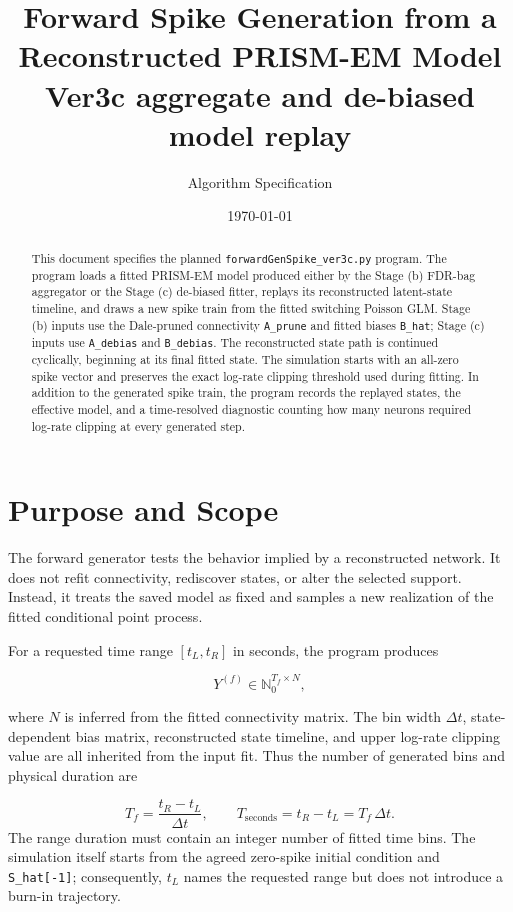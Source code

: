 \documentclass[11pt]{article}
\title{Forward Spike Generation from a Reconstructed PRISM-EM Model\\
\large Ver3c aggregate and de-biased model replay}
\author{Algorithm Specification}
\date{\today}
\begin{document}
\maketitle

\begin{abstract}
This document specifies the planned
\texttt{forwardGenSpike\_ver3c.py} program. The program loads a fitted
PRISM-EM model produced either by the Stage (b) FDR-bag aggregator or the
Stage (c) de-biased fitter, replays its reconstructed latent-state timeline,
and draws a new spike train from the fitted switching Poisson GLM.
Stage (b) inputs use the Dale-pruned connectivity
\texttt{A\_prune} and fitted biases \texttt{B\_hat}; Stage (c) inputs use
\texttt{A\_debias} and \texttt{B\_debias}. The reconstructed state path is
continued cyclically, beginning at its final fitted state. The simulation
starts with an all-zero spike vector and preserves the exact log-rate
clipping threshold used during fitting. In addition to the generated spike
train, the program records the replayed states, the effective model, and a
time-resolved diagnostic counting how many neurons required log-rate
clipping at every generated step.
\end{abstract}

\tableofcontents
\newpage

\section{Purpose and Scope}
\label{sec:scope}

The forward generator tests the behavior implied by a reconstructed
network. It does not refit connectivity, rediscover states, or alter the
selected support. Instead, it treats the saved model as fixed and samples a
new realization of the fitted conditional point process.

For a requested time range \([t_L,t_R]\) in seconds, the program produces

\[
Y^{(f)} \in \mathbb{N}_0^{T_f\times N},
\]

where \(N\) is inferred from the fitted connectivity matrix. The bin width
\(\Delta t\), state-dependent bias matrix, reconstructed state timeline, and
upper log-rate clipping value are all inherited from the input fit. Thus the
number of generated bins and physical duration are

\[
T_f=\frac{t_R-t_L}{\Delta t}, \qquad
T_{\mathrm{seconds}}=t_R-t_L=T_f\,\Delta t.
\]
The range duration must contain an integer number of fitted time bins. The
simulation itself starts from the agreed zero-spike initial condition and
\texttt{S\_hat[-1]}; consequently, \(t_L\) names the requested range but
does not introduce a burn-in trajectory.
\end{document}
